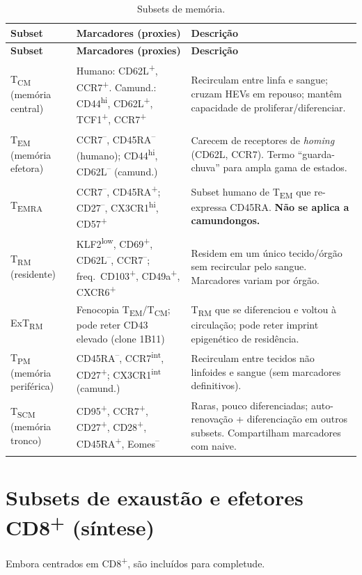 \documentclass[11pt,a4paper]{article}
\newcommand{\up}[1]{\textsuperscript{#1}}          %
\newcommand{\tc}[1]{T\textsubscript{#1}}           %
\begin{document}
\renewcommand{\arraystretch}{1.25}
\small
\begin{longtable}{L{2.2cm} L{6.2cm} L{6.6cm}}
\caption{Subsets de memória.}\label{tab:mem}\\
\toprule
\textbf{Subset} & \textbf{Marcadores (proxies)} & \textbf{Descrição} \\
\midrule
\endfirsthead
\toprule
\textbf{Subset} & \textbf{Marcadores (proxies)} & \textbf{Descrição} \\
\midrule
\endhead
\bottomrule
\endfoot
\tc{CM} (memória central) &
Humano: CD62L\up{+}, CCR7\up{+}. Camund.: CD44\up{hi}, CD62L\up{+}, TCF1\up{+}, CCR7\up{+} &
Recirculam entre linfa e sangue; cruzam HEVs em repouso; mantêm capacidade de
proliferar/diferenciar. \\
\tc{EM} (memória efetora) &
CCR7\up{--}, CD45RA\up{--} (humano); CD44\up{hi}, CD62L\up{--} (camund.) &
Carecem de receptores de \emph{homing} (CD62L, CCR7). Termo ``guarda-chuva'' para ampla gama
de estados. \\
\tc{EMRA} &
CCR7\up{--}, CD45RA\up{+}; CD27\up{--}, CX3CR1\up{hi}, CD57\up{+} &
Subset humano de \tc{EM} que re-expressa CD45RA. \textbf{Não se aplica a camundongos.} \\
\tc{RM} (residente) &
KLF2\up{low}, CD69\up{+}, CD62L\up{--}, CCR7\up{--}; freq.\ CD103\up{+}, CD49a\up{+}, CXCR6\up{+} &
Residem em um único tecido/órgão sem recircular pelo sangue. Marcadores variam por órgão. \\
Ex\tc{RM} &
Fenocopia \tc{EM}/\tc{CM}; pode reter CD43 elevado (clone 1B11) &
\tc{RM} que se diferenciou e voltou à circulação; pode reter imprint epigenético de residência. \\
\tc{PM} (memória periférica) &
CD45RA\up{--}, CCR7\up{int}, CD27\up{+}; CX3CR1\up{int} (camund.) &
Recirculam entre tecidos não linfoides e sangue (sem marcadores definitivos). \\
\tc{SCM} (memória tronco) &
CD95\up{+}, CCR7\up{+}, CD27\up{+}, CD28\up{+}, CD45RA\up{+}, Eomes\up{--} &
Raras, pouco diferenciadas; auto-renovação + diferenciação em outros subsets.
Compartilham marcadores com naive. \\
\end{longtable}
\normalsize

\section{Subsets de exaustão e efetores CD8\texorpdfstring{\up{+}}{+} (síntese)}
Embora centrados em CD8\up{+}, são incluídos para completude.
\end{document}
